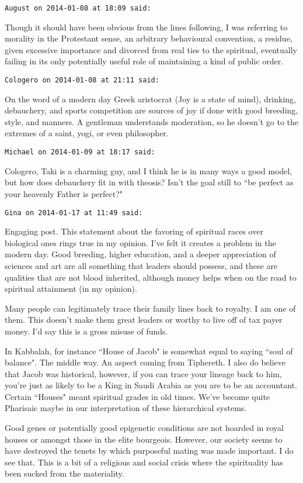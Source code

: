 \begin{footnotesize}
\begin{sffamily}
\texttt{August on 2014-01-08 at 18:09 said: }

Though it should have been obvious from the lines following, I was referring to morality in the Protestant sense, an arbitrary behavioural convention, a residue, given excessive importance and divorced from real ties to the spiritual, eventually failing in its only potentially useful role of maintaining a kind of public order.


\hfill

\texttt{Cologero on 2014-01-08 at 21:11 said: }

On the word of a modern day Greek aristocrat (Joy is a state of mind), drinking, debauchery, and sports competition are sources of joy if done with good breeding, style, and manners. A gentleman understands moderation, so he doesn't go to the extremes of a saint, yogi, or even philosopher.


\hfill

\texttt{Michael on 2014-01-09 at 18:17 said: }

Cologero, Taki is a charming guy, and I think he is in many ways a good model, but how does debauchery fit in with theosis? Isn't the goal still to ``be perfect as your heavenly Father is perfect?"


\hfill

\texttt{Gina on 2014-01-17 at 11:49 said: }

Engaging post. This statement about the favoring of spiritual races over biological ones rings true in my opinion. I've felt it creates a problem in the modern day. Good breeding, higher education, and a deeper appreciation of sciences and art are all something that leaders should possess, and these are qualities that are not blood inherited, although money helps when on the road to spiritual attainment (in my opinion). 

Many people can legitimately trace their family lines back to royalty. I am one of them. This doesn't make them great leaders or worthy to live off of tax payer money. I'd say this is a gross misuse of funds. 

In Kabbalah, for instance ``House of Jacob" is somewhat equal to saying ``soul of balance". The middle way. An aspect coming from Tiphereth. I also do believe that Jacob was historical, however, if you can trace your lineage back to him, you're just as likely to be a King in Saudi Arabia as you are to be an accountant. Certain ``Houses" meant spiritual grades in old times. We've become quite Pharisaic maybe in our interpretation of these hierarchical systems.

Good genes or potentially good epigenetic conditions are not hoarded in royal houses or amongst those in the elite bourgeois. However, our society seems to have destroyed the tenets by which purposeful mating was made important. I do see that. This is a bit of a religious and social crisis where the spirituality has been sucked from the materiality.


\hfill

\end{sffamily}\end{footnotesize}

